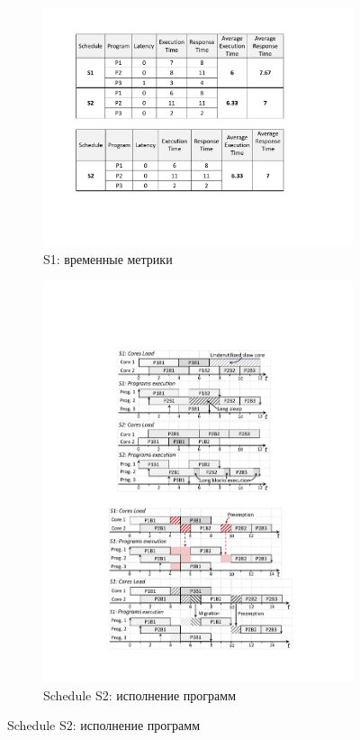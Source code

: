 \begin{figure}
\begin{minipage}{.7\columnwidth}
\begin{subfigure}{\linewidth}
\centering
\includegraphics[width=\linewidth]{figs/s1Metrics.pdf}
\caption{S1: временные метрики}
\vspace{1mm}
\label{fig:s1Metrics}
\end{subfigure}
\end{minipage}

\begin{minipage}{.7\columnwidth}%
\begin{subfigure}{\linewidth}
\includegraphics[width=\linewidth]{figs/s2.pdf}
\caption{Schedule S2: исполнение программ}
\vspace{3mm}
\label{fig:s2}
\end{subfigure}


\end{minipage}
\end{figure}

